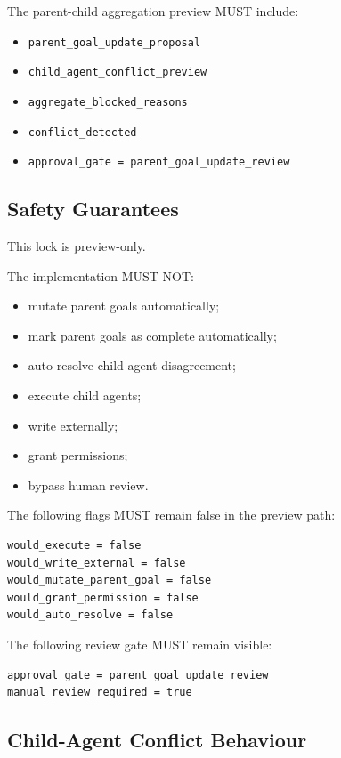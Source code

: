 The parent-child aggregation preview MUST include:

\begin{itemize}
  \item \texttt{parent\_goal\_update\_proposal}
  \item \texttt{child\_agent\_conflict\_preview}
  \item \texttt{aggregate\_blocked\_reasons}
  \item \texttt{conflict\_detected}
  \item \texttt{approval\_gate = parent\_goal\_update\_review}
\end{itemize}

\subsection{Safety Guarantees}

This lock is preview-only.

The implementation MUST NOT:

\begin{itemize}
  \item mutate parent goals automatically;
  \item mark parent goals as complete automatically;
  \item auto-resolve child-agent disagreement;
  \item execute child agents;
  \item write externally;
  \item grant permissions;
  \item bypass human review.
\end{itemize}

The following flags MUST remain false in the preview path:

\begin{verbatim}
would_execute = false
would_write_external = false
would_mutate_parent_goal = false
would_grant_permission = false
would_auto_resolve = false
\end{verbatim}

The following review gate MUST remain visible:

\begin{verbatim}
approval_gate = parent_goal_update_review
manual_review_required = true
\end{verbatim}

\subsection{Child-Agent Conflict Behaviour}

